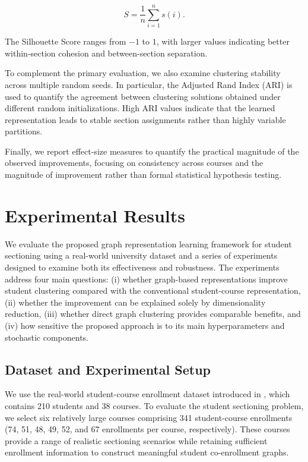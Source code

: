 \documentclass[pdflatex,sn-mathphys-num,iicol]{sn-jnl}%
\theoremstyle{thmstyleone}%
\theoremstyle{thmstyletwo}%
\theoremstyle{thmstylethree}%
\begin{document}
$$
S=\frac{1}{n}\sum_{i=1}^{n}s(i).
$$

The Silhouette Score ranges from $-1$ to $1$, with larger values indicating better within-section cohesion and between-section separation.

To complement the primary evaluation, we also examine clustering stability across multiple random seeds. In particular, the Adjusted Rand Index (ARI) is used to quantify the agreement between clustering solutions obtained under different random initializations. High ARI values indicate that the learned representation leads to stable section assignments rather than highly variable partitions.

Finally, we report effect-size measures to quantify the practical magnitude of the observed improvements, focusing on consistency across courses and the magnitude of improvement rather than formal statistical hypothesis testing.

\section{Experimental Results}
\label{sec:experiments}

We evaluate the proposed graph representation learning framework for student sectioning using a real-world university dataset and a series of experiments designed to examine both its effectiveness and robustness. The experiments address four main questions: (i) whether graph-based representations improve student clustering compared with the conventional student-course representation, (ii) whether the improvement can be explained solely by dimensionality reduction, (iii) whether direct graph clustering provides comparable benefits, and (iv) how sensitive the proposed approach is to its main hyperparameters and stochastic components.

\subsection{Dataset and Experimental Setup}

We use the real-world student-course enrollment dataset introduced in \cite{Amintoosi2005Feature}, which contains 210 students and 38 courses. To evaluate the student sectioning problem, we select six relatively large courses comprising 341 student-course enrollments (74, 51, 48, 49, 52, and 67 enrollments per course, respectively). These courses provide a range of realistic sectioning scenarios while retaining sufficient enrollment information to construct meaningful student co-enrollment graphs.
\end{document}
